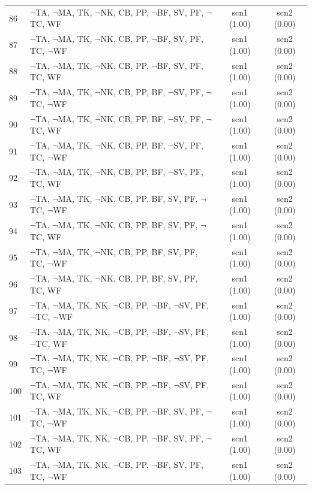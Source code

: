 \documentclass[12pt]{article}
\begin{document}
\begin{longtable}{|l|l|c|c|}
86 & $\neg$TA, $\neg$MA, TK, $\neg$NK, CB, PP, $\neg$BF, SV, PF, $\neg$TC, WF & scn1 (1.00) & scn2 (0.00)\\
87 & $\neg$TA, $\neg$MA, TK, $\neg$NK, CB, PP, $\neg$BF, SV, PF, TC, $\neg$WF & scn1 (1.00) & scn2 (0.00)\\
88 & $\neg$TA, $\neg$MA, TK, $\neg$NK, CB, PP, $\neg$BF, SV, PF, TC, WF & scn1 (1.00) & scn2 (0.00)\\
89 & $\neg$TA, $\neg$MA, TK, $\neg$NK, CB, PP, BF, $\neg$SV, PF, $\neg$TC, $\neg$WF & scn1 (1.00) & scn2 (0.00)\\
90 & $\neg$TA, $\neg$MA, TK, $\neg$NK, CB, PP, BF, $\neg$SV, PF, $\neg$TC, WF & scn1 (1.00) & scn2 (0.00)\\
91 & $\neg$TA, $\neg$MA, TK, $\neg$NK, CB, PP, BF, $\neg$SV, PF, TC, $\neg$WF & scn1 (1.00) & scn2 (0.00)\\
92 & $\neg$TA, $\neg$MA, TK, $\neg$NK, CB, PP, BF, $\neg$SV, PF, TC, WF & scn1 (1.00) & scn2 (0.00)\\
93 & $\neg$TA, $\neg$MA, TK, $\neg$NK, CB, PP, BF, SV, PF, $\neg$TC, $\neg$WF & scn1 (1.00) & scn2 (0.00)\\
94 & $\neg$TA, $\neg$MA, TK, $\neg$NK, CB, PP, BF, SV, PF, $\neg$TC, WF & scn1 (1.00) & scn2 (0.00)\\
95 & $\neg$TA, $\neg$MA, TK, $\neg$NK, CB, PP, BF, SV, PF, TC, $\neg$WF & scn1 (1.00) & scn2 (0.00)\\
96 & $\neg$TA, $\neg$MA, TK, $\neg$NK, CB, PP, BF, SV, PF, TC, WF & scn1 (1.00) & scn2 (0.00)\\
97 & $\neg$TA, $\neg$MA, TK, NK, $\neg$CB, PP, $\neg$BF, $\neg$SV, PF, $\neg$TC, $\neg$WF & scn1 (1.00) & scn2 (0.00)\\
98 & $\neg$TA, $\neg$MA, TK, NK, $\neg$CB, PP, $\neg$BF, $\neg$SV, PF, $\neg$TC, WF & scn1 (1.00) & scn2 (0.00)\\
99 & $\neg$TA, $\neg$MA, TK, NK, $\neg$CB, PP, $\neg$BF, $\neg$SV, PF, TC, $\neg$WF & scn1 (1.00) & scn2 (0.00)\\
100 & $\neg$TA, $\neg$MA, TK, NK, $\neg$CB, PP, $\neg$BF, $\neg$SV, PF, TC, WF & scn1 (1.00) & scn2 (0.00)\\
101 & $\neg$TA, $\neg$MA, TK, NK, $\neg$CB, PP, $\neg$BF, SV, PF, $\neg$TC, $\neg$WF & scn1 (1.00) & scn2 (0.00)\\
102 & $\neg$TA, $\neg$MA, TK, NK, $\neg$CB, PP, $\neg$BF, SV, PF, $\neg$TC, WF & scn1 (1.00) & scn2 (0.00)\\
103 & $\neg$TA, $\neg$MA, TK, NK, $\neg$CB, PP, $\neg$BF, SV, PF, TC, $\neg$WF & scn1 (1.00) & scn2 (0.00)\\

\end{longtable}
\end{document}
